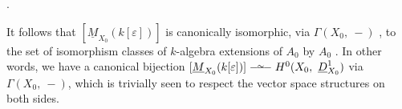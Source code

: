 \begin{center}
\quad .
\end{center}
It follows that  $[\underline{M}_{X_{0}}(k[\varepsilon])]$  is canonically isomorphic, via  $\Gamma(X_{0},\ -)$ , to the set of isomorphism classes of $k$-algebra extensions of  $A_{0}$  by  $A_{0}$ . In other words, we have a canonical bijection  $[\underline{M}_{X_{0}}(k[\varepsilon])] \overset{\sim}{\relbar\joinrel\relbar\joinrel\relbar} H^{0}(X_{0},\ \underline{D}^{1}_{X_{0}})$  via $\Gamma(X_{0},\ -)$, which is trivially seen to respect the vector space structures on both sides.



